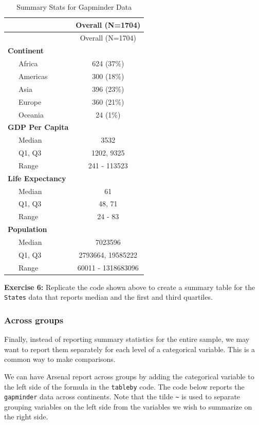 \documentclass[
]{book}
\newenvironment{rmdblock}[1]
  {\begin{shaded*}
  }
  {\end{shaded*}
  }
\newenvironment{learncheck}
  {\begin{rmdblock}{warning}}
  {\end{rmdblock}}
\begin{document}
\begin{longtable}[]{@{}lc@{}}
\caption{Summary Stats for Gapminder Data}\tabularnewline
\toprule
& Overall (N=1704) \\
\midrule
\endfirsthead
\toprule
& Overall (N=1704) \\
\midrule
\endhead
\textbf{Continent} & \\
~~~Africa & 624 (37\%) \\
~~~Americas & 300 (18\%) \\
~~~Asia & 396 (23\%) \\
~~~Europe & 360 (21\%) \\
~~~Oceania & 24 (1\%) \\
\textbf{GDP Per Capita} & \\
~~~Median & 3532 \\
~~~Q1, Q3 & 1202, 9325 \\
~~~Range & 241 - 113523 \\
\textbf{Life Expectancy} & \\
~~~Median & 61 \\
~~~Q1, Q3 & 48, 71 \\
~~~Range & 24 - 83 \\
\textbf{Population} & \\
~~~Median & 7023596 \\
~~~Q1, Q3 & 2793664, 19585222 \\
~~~Range & 60011 - 1318683096 \\
\bottomrule
\end{longtable}

\begin{learncheck}
\textbf{Exercise 6:} Replicate the code shown above to create a summary
table for the \texttt{States} data that reports median and the first and
third quartiles.
\end{learncheck}

\hypertarget{across-groups}{%
\subsubsection{Across groups}\label{across-groups}}

Finally, instead of reporting summary statistics for the entire sample, we may want to report them separately for each level of a categorical variable. This is a common way to make comparisons.

We can have Arsenal report across groups by adding the categorical variable to the left side of the formula in the \texttt{tableby} code. The code below reports the \texttt{gapminder} data across continents. Note that the tilde \texttt{\textasciitilde{}} is used to separate grouping variables on the left side from the variables we wish to summarize on the right side.
\end{document}
